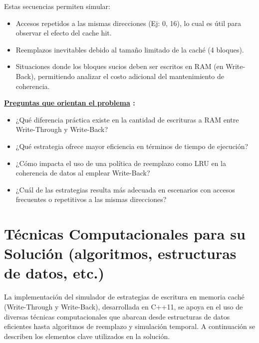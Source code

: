 \documentclass{article}
\begin{document}
{Estas secuencias permiten simular:}


\begin{itemize}
    \item Accesos repetidos a las mismas direcciones (Ej: 0, 16), lo cual es útil para observar el efecto del cache hit.
    \item Reemplazos inevitables debido al tamaño limitado de la caché (4 bloques).
    \item Situaciones donde los bloques sucios deben ser escritos en RAM (en Write-Back), permitiendo analizar el costo adicional del mantenimiento de coherencia.
\end{itemize}

\quad


\textbf{ \underline{Preguntas que orientan el problema} :}

\quad

\begin{itemize}
    \item ¿Qué diferencia práctica existe en la cantidad de escrituras a RAM entre Write-Through y Write-Back?
    \item ¿Qué estrategia ofrece mayor eficiencia en términos de tiempo de ejecución?
    \item ¿Cómo impacta el uso de una política de reemplazo como LRU en la coherencia de datos al emplear Write-Back?
    \item ¿Cuál de las estrategias resulta más adecuada en escenarios con accesos frecuentes o repetitivos a las mismas direcciones?
\end{itemize}

\quad
\newpage





\section{Técnicas Computacionales para su Solución (algoritmos, estructuras de datos, etc.)}

\quad

{La implementación del simulador de estrategias de escritura en memoria caché (Write-Through y Write-Back), desarrollada en C++11, se apoya en el uso de diversas técnicas computacionales que abarcan desde estructuras de datos eficientes hasta algoritmos de reemplazo y simulación temporal. A continuación se describen los elementos clave utilizados en la solución.}

\quad
\end{document}
